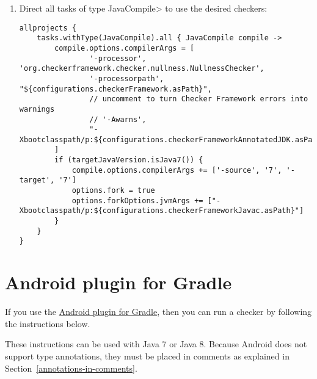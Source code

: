 \begin{enumerate}
\item Direct all tasks of type \<JavaCompile> to use the desired checkers:

\begin{mysmall}
\begin{Verbatim}
allprojects {
    tasks.withType(JavaCompile).all { JavaCompile compile ->
        compile.options.compilerArgs = [
                '-processor', 'org.checkerframework.checker.nullness.NullnessChecker',
                '-processorpath', "${configurations.checkerFramework.asPath}",
                // uncomment to turn Checker Framework errors into warnings
                // '-Awarns',
                "-Xbootclasspath/p:${configurations.checkerFrameworkAnnotatedJDK.asPath}"
        ]
        if (targetJavaVersion.isJava7()) {
            compile.options.compilerArgs += ['-source', '7', '-target', '7']
            options.fork = true
            options.forkOptions.jvmArgs += ["-Xbootclasspath/p:${configurations.checkerFrameworkJavac.asPath}"]
        }
    }
}
\end{Verbatim}
\end{mysmall}
\end{enumerate}

\section{Android plugin for Gradle\label{android-gradle}}

If you use the
\href{https://developer.android.com/studio/build/index.html}{Android plugin for Gradle},
then you can run a checker by following the instructions below.

These instructions can be used with Java 7 or Java 8.  Because Android does not
support type annotations, they must be placed in comments as explained in
Section~\ref{annotations-in-comments}.

